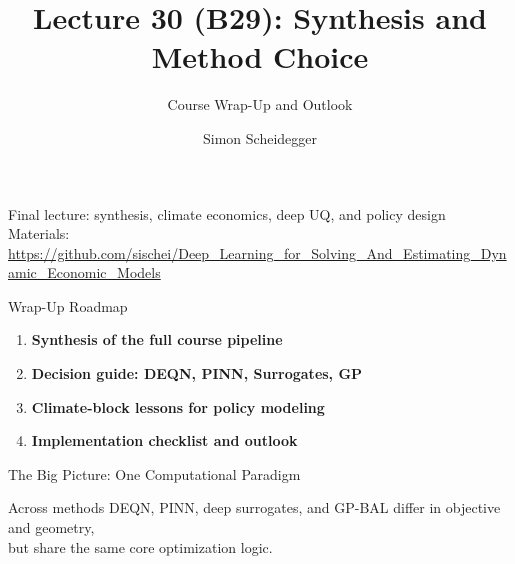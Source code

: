 \documentclass[aspectratio=169,11pt]{beamer}
\title[Lecture 30 (B29)]{Lecture 30 (B29): Synthesis and Method Choice}
\subtitle{Course Wrap-Up and Outlook}
\author{Simon Scheidegger}
\institute{HEC, University of Lausanne}
\date{}
\begin{document}
{
\begin{frame}
\titlepage
\vspace{-0.4cm}
\begin{center}
{\footnotesize Final lecture: synthesis, climate economics, deep UQ, and policy design}\\[4pt]
{\footnotesize Materials: \url{https://github.com/sischei/Deep_Learning_for_Solving_And_Estimating_Dynamic_Economic_Models}}
\end{center}
\end{frame}
}

\begin{frame}{Wrap-Up Roadmap}
\begin{enumerate}
    \item \textbf{Synthesis of the full course pipeline}
    \item \textbf{Decision guide: DEQN, PINN, Surrogates, GP}
    \item \textbf{Climate-block lessons for policy modeling}
    \item \textbf{Implementation checklist and outlook}
\end{enumerate}
\end{frame}

\begin{frame}{The Big Picture: One Computational Paradigm}
\begin{center}
\end{center}

\vspace{0.25cm}
\begin{block}{Across methods}
DEQN, PINN, deep surrogates, and GP-BAL differ in objective and geometry,\\
but share the same core optimization logic.
\end{block}
\end{frame}
\end{document}
